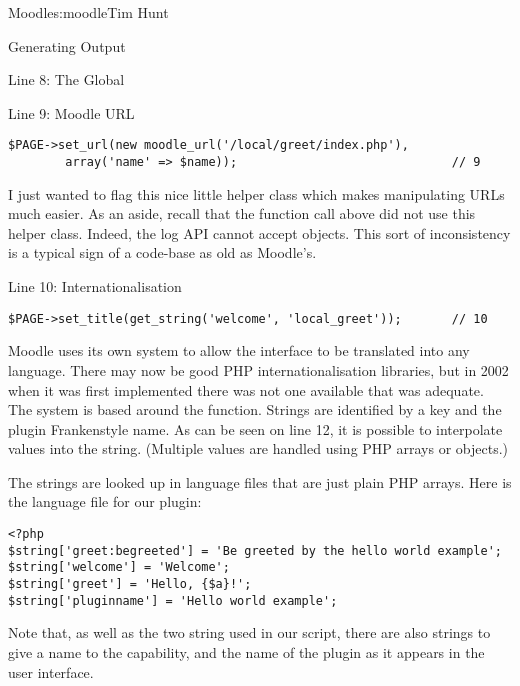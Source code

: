 \begin{aosachapter}{Moodle}{s:moodle}{Tim Hunt}
\begin{aosasect1}{Generating Output}
\begin{aosasect2}{Line 8: The  Global}
\end{aosasect2}

\begin{aosasect2}{Line 9: Moodle URL}

\begin{verbatim}
$PAGE->set_url(new moodle_url('/local/greet/index.php'),
        array('name' => $name));                              // 9
\end{verbatim}

I just wanted to flag this nice little helper class which makes manipulating URLs much easier. As an
aside, recall that the  function call above did not
use this helper class. Indeed, the log API cannot accept
 objects. This sort of inconsistency is a typical
sign of a code-base as old as Moodle's.

\end{aosasect2}

\begin{aosasect2}{Line 10: Internationalisation}

\begin{verbatim}
$PAGE->set_title(get_string('welcome', 'local_greet'));       // 10
\end{verbatim}

Moodle uses its own system to allow the interface to be translated
into any language. There may now be good PHP internationalisation
libraries, but in 2002 when it was first implemented there was not one
available that was adequate. The system is based around the
 function. Strings are identified by a key and the
plugin Frankenstyle name. As can be seen on line 12, it is possible to
interpolate values into the string. (Multiple values are handled using
PHP arrays or objects.)

The strings are looked up in language files that are just plain PHP
arrays. Here is the language file
 for our plugin:

\begin{verbatim}
<?php
$string['greet:begreeted'] = 'Be greeted by the hello world example';
$string['welcome'] = 'Welcome';
$string['greet'] = 'Hello, {$a}!';
$string['pluginname'] = 'Hello world example';
\end{verbatim}

Note that, as well as the two string used in our script, there are also
strings to give a name to the capability, and 
the name of the plugin as
it appears in the user interface.


\end{aosasect2}
\end{aosasect1}
\end{aosachapter}
